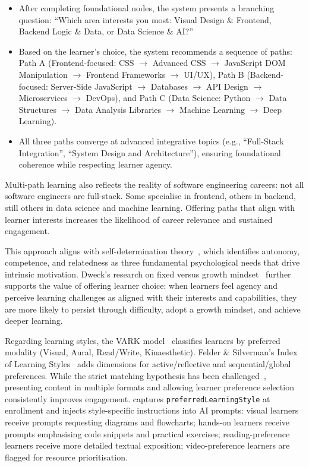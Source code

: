 \begin{itemize}
    \item After completing foundational nodes, the system presents a branching question: \enquote{Which area interests you most: Visual Design \& Frontend, Backend Logic \& Data, or Data Science \& AI?}
    \item Based on the learner's choice, the system recommends a sequence of paths: Path A (Frontend-focused: CSS \(\rightarrow\) Advanced CSS \(\rightarrow\) JavaScript DOM Manipulation \(\rightarrow\) Frontend Frameworks \(\rightarrow\) UI/UX), Path B (Backend-focused: Server-Side JavaScript \(\rightarrow\) Databases \(\rightarrow\) API Design \(\rightarrow\) Microservices \(\rightarrow\) DevOps), and Path C (Data Science: Python \(\rightarrow\) Data Structures \(\rightarrow\) Data Analysis Libraries \(\rightarrow\) Machine Learning \(\rightarrow\) Deep Learning).
    \item All three paths converge at advanced integrative topics (e.g., \enquote{Full-Stack Integration}, \enquote{System Design and Architecture}), ensuring foundational coherence while respecting learner agency.
\end{itemize}

Multi-path learning also reflects the reality of software engineering careers: not all software engineers are full-stack. Some specialise in frontend, others in backend, still others in data science and machine learning. Offering paths that align with learner interests increases the likelihood of career relevance and sustained engagement.

This approach aligns with self-determination theory~\cite{ryan2000, deci1985}, which identifies autonomy, competence, and relatedness as three fundamental psychological needs that drive intrinsic motivation. Dweck's research on fixed versus growth mindset~\cite{dweck2006} further supports the value of offering learner choice: when learners feel agency and perceive learning challenges as aligned with their interests and capabilities, they are more likely to persist through difficulty, adopt a growth mindset, and achieve deeper learning.

Regarding learning styles, the VARK model~\cite{fleming1992} classifies learners by preferred modality (Visual, Aural, Read/Write, Kinaesthetic). Felder \& Silverman's Index of Learning Styles~\cite{felder1988} adds dimensions for active/reflective and sequential/global preferences. While the strict matching hypothesis has been challenged~\cite{pashler2008}, presenting content in multiple formats and allowing learner preference selection consistently improves engagement. \projectname{} captures \texttt{preferredLearningStyle} at enrollment and injects style-specific instructions into AI prompts: visual learners receive prompts requesting diagrams and flowcharts; hands-on learners receive prompts emphasising code snippets and practical exercises; reading-preference learners receive more detailed textual exposition; video-preference learners are flagged for resource prioritisation.

